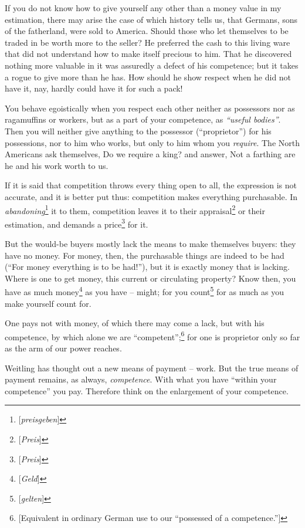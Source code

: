 If you do not know how to give yourself any other than a money value in my 
estimation, there may arise the case of which history tells us, that Germans, 
sons of the fatherland, were sold to America. Should those who let themselves 
to be traded in be worth more to the seller? He preferred the cash to this 
living ware that did not understand how to make itself precious to him. That 
he discovered nothing more valuable in it was assuredly a defect of his 
competence; but it takes a rogue to give more than he has. How should he show 
respect when he did not have it, nay, hardly could have it for such a pack!

You behave egoistically when you respect each other neither as possessors nor 
as ragamuffins or workers, but as a part of your competence, as 
\textit{``useful bodies''}. Then you will neither give anything to the 
possessor (``proprietor'') for his possessions, nor to him who works, but 
only to him whom you \textit{require}. The North Americans ask themselves, Do 
we require a king? and answer, Not a farthing are he and his work worth to us.

If it is said that competition throws every thing open to all, the expression 
is not accurate, and it is better put thus: competition makes everything 
purchasable. In \textit{abandoning}\footnote{[\textit{preisgeben}]} it to 
them, competition leaves it to their appraisal\footnote{[\textit{Preis}]} or 
their estimation, and demands a price\footnote{[\textit{Preis}]} for it.

But the would-be buyers mostly lack the means to make themselves buyers: they 
have no money. For money, then, the purchasable things are indeed to be had 
(``For money everything is to be had!''), but it is exactly money that is 
lacking. Where is one to get money, this current or circulating property? Know 
then, you have as much money\footnote{[\textit{Geld}]} as you have -- might; 
for you count\footnote{[\textit{gelten}]} for as much as you make yourself 
count for.

One pays not with money, of which there may come a lack, but with his 
competence, by which alone we are ``competent'';\footnote{[Equivalent in 
ordinary German use to our ``possessed of a competence.'']} for one is 
proprietor only so far as the arm of our power reaches.

Weitling has thought out a new means of payment -- work. But the true means of 
payment remains, as always, \textit{competence}. With what you have ``within 
your competence'' you pay. Therefore think on the enlargement of your 
competence.


